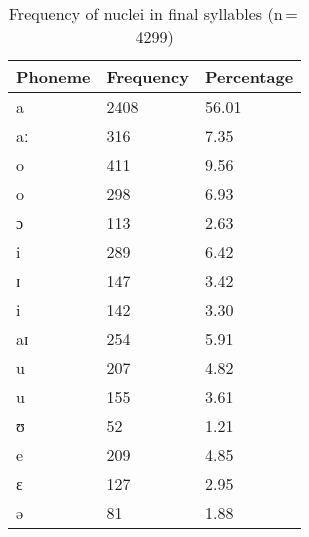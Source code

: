 \begin{table}[pth]\centering
\caption[Frequency of nuclei in final syllables]{Frequency of nuclei in final syllables (n\,=\,4299)}
\begin{tabu} to 0.5\textwidth{X X[c] X[c]}
\tableheaderfont\toprule
Phoneme
	& Frequency
	& Percentage
	\\
	
\toprule

a
	& 2408
	& 56.01\pct
	\\

aː
	& 316
	& 7.35\pct
	\\

\midrule

o
	& 411
	& 9.56\pct
	\\

\rowfont{\scriptsize\itshape}
\raggedleft
o
	& 298
	& 6.93\pct
	\\

\rowfont{\scriptsize\itshape}
\raggedleft
ɔ
	& 113
	& 2.63\pct
	\\

\midrule

i
	& 289
	& 6.42\pct
	\\

\rowfont{\scriptsize\itshape}
\raggedleft
ɪ
	& 147
	& 3.42\pct
	\\

\rowfont{\scriptsize\itshape}
\raggedleft
i
	& 142
	& 3.30\pct
	\\

\midrule

aɪ
	& 254
	& 5.91\pct
	\\

\midrule

u
	& 207
	& 4.82\pct
	\\

\rowfont{\scriptsize\itshape}
\raggedleft
u
	& 155
	& 3.61\pct
	\\

\rowfont{\scriptsize\itshape}
\raggedleft
ʊ
	& 52
	& 1.21\pct
	\\

\midrule

e
	& 209
	& 4.85\pct
	\\

\rowfont{\scriptsize\itshape}
\raggedleft
ɛ
	& 127
	& 2.95\pct
	\\

\rowfont{\scriptsize\itshape}
\raggedleft
ə
	& 81
	& 1.88\pct
	\\


\end{tabu}
\end{table}

